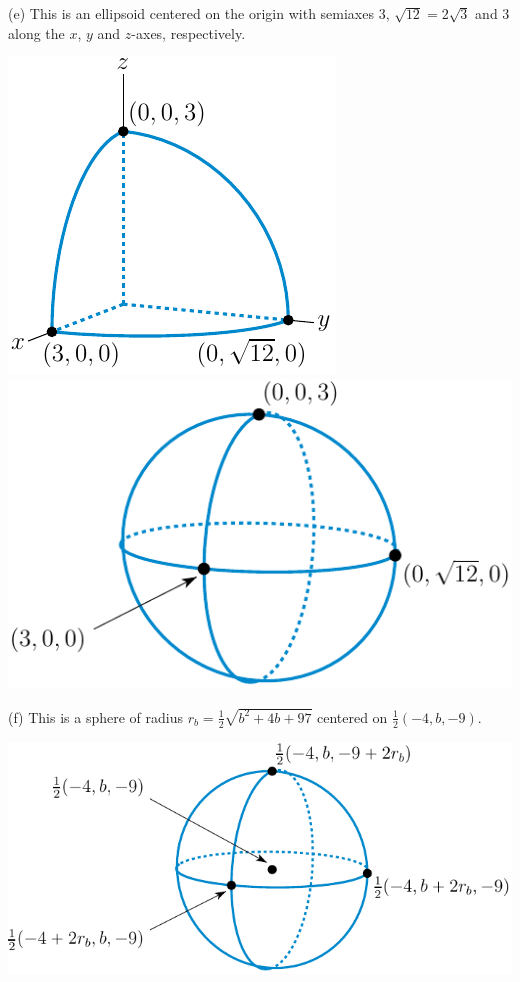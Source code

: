 \begin{answer}
(e)
This is an ellipsoid centered on the origin with semiaxes $3$, 
$\sqrt{12}=2\sqrt{3}$ and $3$ along the $x$, $y$ and $z$-axes, respectively.
\begin{center}
     \includegraphics{fig/ellipsoid_l.pdf}\qquad
     \includegraphics[scale=0.9]{fig/ellipsoid_r.pdf}
\end{center}

(f) 
This is a sphere of radius $r_b=\frac{1}{2}\sqrt{b^2+4b+97}$ centered on 
$\frac{1}{2}(-4,b,-9)$.
\begin{center}
     \includegraphics{fig/shiftSphere.pdf}
\end{center}


\end{answer}
